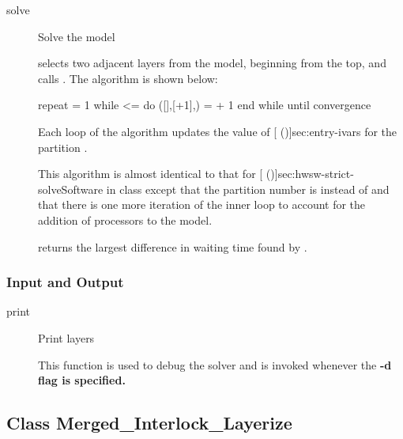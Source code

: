 \begin{description}

\item[solve] \texonly{---} Solve the model\\

 selects two adjacent layers from the model,
beginning from the top, and calls
.  The algorithm is
shown below:

\begin{example}
  repeat
     = 1
    while  <=  do
      ([],[+1],)
       =  + 1
    end while
  until convergence
\end{example}

Each loop of the algorithm updates the value of
[ (\Sec\Ref)]{sec:entry-ivars} for the partition
.  

This algorithm is almost identical to that for
[
(\Sec\Ref)]{sec:hwsw-strict-solveSoftware} in class
 except that the partition number is
 instead of  and that there is one more
iteration of the inner loop to account for the addition of processors
to the model.

 returns the largest difference in waiting time found by
.

\end{description}

\subsubsection{Input and Output}

\begin{description}
\item[print] \texonly{---} Print layers\\

This function is used to debug the solver and is invoked whenever the
\bf{-d} flag is specified.

\end{description}

\htmlrule
\subsection{Class Merged\_Interlock\_Layerize}
\label{sec:merged-interlock}

